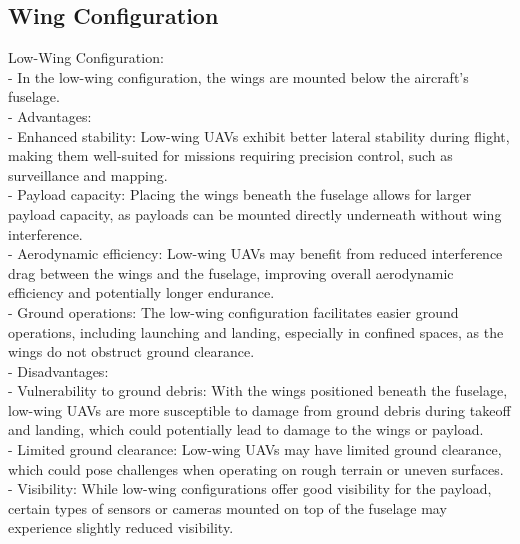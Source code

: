 \documentclass[12 pt]{article}
\begin{document}
\color{red}
\subsection{Wing Configuration}

Low-Wing Configuration:
\color{black}
\\- In the low-wing configuration, the wings are mounted below the aircraft's fuselage.
\color{red}
\\- Advantages:
\color{black}
 \\- Enhanced stability: Low-wing UAVs exhibit better lateral stability during flight, making them well-suited for missions requiring precision control, such as surveillance and mapping.
\\  - Payload capacity: Placing the wings beneath the fuselage allows for larger payload capacity, as payloads can be mounted directly underneath without wing interference.
\\  - Aerodynamic efficiency: Low-wing UAVs may benefit from reduced interference drag between the wings and the fuselage, improving overall aerodynamic efficiency and potentially longer endurance.
\\  - Ground operations: The low-wing configuration facilitates easier ground operations, including launching and landing, especially in confined spaces, as the wings do not obstruct ground clearance.
\color{red}
\\- Disadvantages:
\color{black}
\\  - Vulnerability to ground debris: With the wings positioned beneath the fuselage, low-wing UAVs are more susceptible to damage from ground debris during takeoff and landing, which could potentially lead to damage to the wings or payload.
 \\ - Limited ground clearance: Low-wing UAVs may have limited ground clearance, which could pose challenges when operating on rough terrain or uneven surfaces.
\\  - Visibility: While low-wing configurations offer good visibility for the payload, certain types of sensors or cameras mounted on top of the fuselage may experience slightly reduced visibility.
\end{document}
